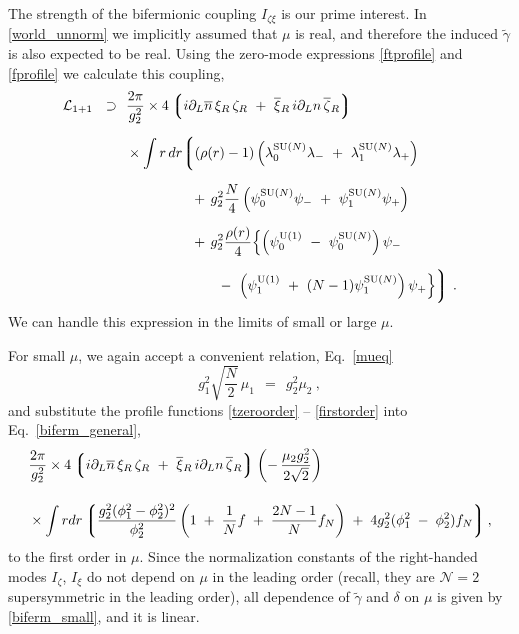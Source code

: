 \documentclass[12pt]{article}
\newcommand{\ntwo}{${\mathcal N}=2$ }
\newcommand{\p}{\partial}
\newcommand{\wt}{\widetilde}
\newcommand{\ov}{\overline}
\newcommand{\mc}[1]{\mathcal{#1}}
\newcommand{\lgr}{\left\lgroup}
\newcommand{\rgr}{\right\rgroup}
\newcommand{\loN}{\lambda_0^\text{SU($N$)}}
\newcommand{\llN}{\lambda_1^\text{SU($N$)}}
\newcommand{\poU}{\psi_0^{\rm U(1)}}
\newcommand{\plU}{\psi_1^{\rm U(1)}}
\newcommand{\poN}{\psi_0^\text{SU($N$)}}
\newcommand{\plN}{\psi_1^\text{SU($N$)}}
\newcommand{\tgamma}{\wt{\gamma}}
\begin{document}
	The strength of the bifermionic coupling $ I_{\zeta\xi} $ is  our prime  interest.
	In \eqref{world_unnorm} we  implicitly assumed that $ \mu $ is real, and therefore
	the induced $ \tgamma $ is also expected to be real.
	Using the zero-mode expressions \eqref{ftprofile} and \eqref{fprofile} we calculate this coupling,
\begin{align}
%
\notag
	\mc{L}_{\rm 1+1} ~~\supset~~
	&
	\frac{2\pi}{g_2^2} \times  
	4 \lgr  i\p_L \ov{n}\, \xi_R \, \zeta_R  ~+~  \ov{\xi}{}_R \, i \p_L n\, \ov{\zeta}{}_R \rgr
	\\[2mm]
%
\notag
	&
	\times
	\int r\, dr 
	\biggl\lgroup  ( \rho(r)-1 ) \left( \loN \lambda_-   ~+~   \llN \lambda_+ \right)  \\[2mm]
%
\label{biferm_general}
	&
	\qquad\qquad~~
	+\,g_2^2 \frac{N}{4} \left( \poN \psi_-   ~+~   \plN \psi_+ \right)   
	\\[2mm]
%
\notag
	&
	\qquad\qquad~~
	+\, g_2^2 \frac{\rho(r)}{4} \Bigl\{ \left(\poU ~-~ \poN\right) \psi_-   \\[2mm]
\notag
	&
	\qquad\qquad\qquad\;\;
	     		         	-~ \left(\plU ~+~ (N-1)\plN\right) \psi_+ \Bigr\} 
	\biggr\rgroup~.
\end{align}
	We can handle this expression in the limits of small or large $ \mu $.

	For small $ \mu $, we again accept a convenient relation, Eq.~\eqref{mueq}
\[
	g_1^2 \sqrt{\frac{N}{2}}\, \mu_1 ~~=~~ g_2^2 \mu_2~,
\]
	and substitute the profile functions \eqref{tzeroorder} -- \eqref{firstorder} into Eq.~\eqref{biferm_general},
\begin{align}
%
\label{biferm_small}
	&
	\frac{2\pi}{g_2^2} \times  
	4 \lgr  i\p_L \ov{n}\, \xi_R \, \zeta_R  ~+~  \ov{\xi}{}_R \, i \p_L n\, \ov{\zeta}{}_R \rgr
	\left( -\, \frac{\mu_2 g_2^2}{2\sqrt{2}} \right)
	\\[4mm]
%
\notag
	&
	\times
	\int r dr 
	\lgr  \frac{g_2^2(\phi_1^2 - \phi_2^2)^2}{\phi_2^2} 
			\left( 1 \;+\; \frac{1}{N} f \;+\; \frac{2N - 1}{N}f_N \right) 
			\;+\;
		4 g_2^2 (\phi_1^2 \;-\; \phi_2^2) f_N \rgr,
\end{align}
	to the first order in $ \mu $.
	Since the normalization constants of the right-handed modes $ I_\zeta $, $ I_\xi $ do not
	depend on $ \mu $ in the leading order (recall, they are \ntwo supersymmetric in the leading order),
	all dependence of $ \tgamma $ and $ \delta $ on $ \mu $ is given by \eqref{biferm_small},
	and it is linear.
\end{document}
